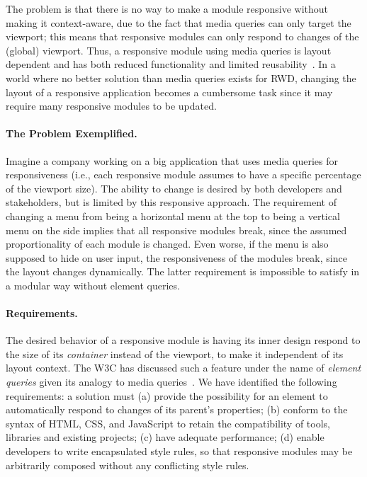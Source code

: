 \documentclass[sigconf,9pt]{acmart}
\begin{document}
  The problem is that there is no way to make a module responsive without making it context-aware, due to the fact that media queries can only target the viewport; this means that responsive modules can only respond to changes of the (global) viewport.
  Thus, a responsive module using media queries is layout dependent and has both reduced functionality and limited reusability~\cite{elq-thesis}.
  In a world where no better solution than media queries exists for RWD, changing the layout of a responsive application becomes a cumbersome task since it may require many responsive modules to be updated.

  \paragraph{The Problem Exemplified.}
    Imagine a company working on a big application that uses media queries for responsiveness (i.e., each responsive module assumes to have a specific percentage of the viewport size).
    The ability to change is desired by both developers and stakeholders, but is limited by this responsive approach.
    The requirement of changing a menu from being a horizontal menu at the top to being a vertical menu on the side implies that all responsive modules break, since the assumed proportionality of each module is changed.
    Even worse, if the menu is also supposed to hide on user input, the responsiveness of the modules break, since the layout changes dynamically.
    The latter requirement is impossible to satisfy in a modular way without element queries.

  \paragraph{Requirements.}\label{sec:reqs}
    The desired behavior of a responsive module is having its inner
    design respond to the size of its \emph{container} instead of the
    viewport, to make it independent of its layout context.  The W3C
    has discussed such a feature under the name of \emph{element
      queries} given its analogy to media queries~\cite{w3c_eq_mail}.
    We have identified the following requirements: a solution must (a)
    provide the possibility for an element to automatically respond to
    changes of its parent's properties; (b) conform to the syntax of
    HTML, CSS, and JavaScript to retain the compatibility of tools,
    libraries and existing projects; (c) have adequate performance;
    (d) enable developers to write encapsulated style rules, so that
    responsive modules may be arbitrarily composed without any
    conflicting style rules.
\end{document}
